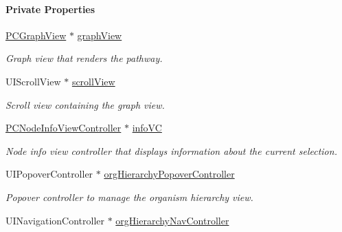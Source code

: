 \begin{Indent}\paragraph*{Private Properties}
\begin{DoxyCompactItemize}
\item 
\hypertarget{interface_p_c_graph_view_controller_a9a2c85b5e19e3be537ad3590086c2e13}{
\hyperlink{interface_p_c_graph_view}{PCGraphView} $\ast$ \hyperlink{interface_p_c_graph_view_controller_a9a2c85b5e19e3be537ad3590086c2e13}{graphView}}
\label{interface_p_c_graph_view_controller_a9a2c85b5e19e3be537ad3590086c2e13}

\begin{DoxyCompactList}\small\item\em Graph view that renders the pathway. \end{DoxyCompactList}\item 
\hypertarget{interface_p_c_graph_view_controller_acf6e0d6a8542937442e462cf813e67a8}{
UIScrollView $\ast$ \hyperlink{interface_p_c_graph_view_controller_acf6e0d6a8542937442e462cf813e67a8}{scrollView}}
\label{interface_p_c_graph_view_controller_acf6e0d6a8542937442e462cf813e67a8}

\begin{DoxyCompactList}\small\item\em Scroll view containing the graph view. \end{DoxyCompactList}\item 
\hypertarget{interface_p_c_graph_view_controller_a16552e14fdbedbe4b1b156b834a13e0c}{
\hyperlink{interface_p_c_node_info_view_controller}{PCNodeInfoViewController} $\ast$ \hyperlink{interface_p_c_graph_view_controller_a16552e14fdbedbe4b1b156b834a13e0c}{infoVC}}
\label{interface_p_c_graph_view_controller_a16552e14fdbedbe4b1b156b834a13e0c}

\begin{DoxyCompactList}\small\item\em Node info view controller that displays information about the current selection. \end{DoxyCompactList}\item 
\hypertarget{interface_p_c_graph_view_controller_ae5df141b7138e1aa06f5900e0199d99b}{
UIPopoverController $\ast$ \hyperlink{interface_p_c_graph_view_controller_ae5df141b7138e1aa06f5900e0199d99b}{orgHierarchyPopoverController}}
\label{interface_p_c_graph_view_controller_ae5df141b7138e1aa06f5900e0199d99b}

\begin{DoxyCompactList}\small\item\em Popover controller to manage the organism hierarchy view. \end{DoxyCompactList}\item 
\hypertarget{interface_p_c_graph_view_controller_a6cbd0d2a822ad40a8bcfcb8644f1f5bc}{
UINavigationController $\ast$ \hyperlink{interface_p_c_graph_view_controller_a6cbd0d2a822ad40a8bcfcb8644f1f5bc}{orgHierarchyNavController}}
\label{interface_p_c_graph_view_controller_a6cbd0d2a822ad40a8bcfcb8644f1f5bc}


\end{DoxyCompactItemize}
\end{Indent}
